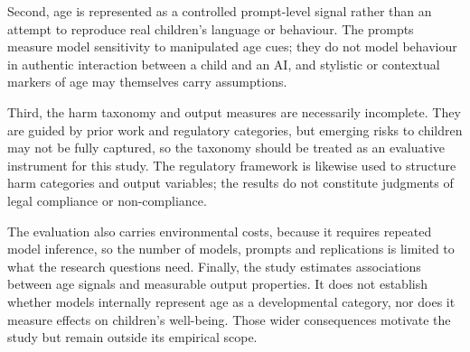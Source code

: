 Second, age is represented as a controlled prompt-level signal rather than an
attempt to reproduce real children's language or behaviour. The prompts measure
model sensitivity to manipulated age cues; they do not model behaviour in
authentic interaction between a child and an AI, and stylistic or contextual
markers of age may themselves carry assumptions.

Third, the harm taxonomy and output measures are necessarily incomplete. They
are guided by prior work and regulatory categories, but emerging risks to
children may not be fully captured, so the taxonomy should be treated as an
evaluative instrument for this study. The regulatory framework is likewise used
to structure harm categories and output variables; the results do not constitute
judgments of legal compliance or non-compliance.

The evaluation also carries environmental costs, because it requires repeated
model inference, so the number of models, prompts and replications is limited to
what the research questions need. Finally, the study estimates associations
between age signals and measurable output properties. It does not establish
whether models internally represent age as a developmental category, nor does it
measure effects on children's well-being. Those wider consequences motivate the
study but remain outside its empirical scope.
